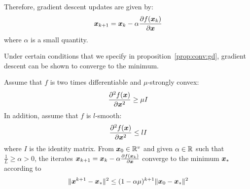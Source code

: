 Therefore, gradient descent updates are given by:
\begin{align}
  \xb_{k+1} = \xb_k -\alpha \partialfrac{\xb}{f(\xb_k)} \label{eq:update:gd}
\end{align}
where $\alpha$ is a small quantity.

Under certain conditions that we specify in proposition~\ref{prop:conv:gd},
gradient descent can be shown to converge to the minimum.

\begin{prop}
  \label{prop:conv:gd}
  Assume that $f$ is two times differentiable and $\mu$-strongly convex:
  \begin{equation}
    \partialfrac{\xb^2}{^2f(\xb)} \geq \mu I
  \end{equation}
  In addition, assume that $f$ is $l$-smooth:
  \begin{equation}
    \partialfrac{\xb^2}{^2f(\xb)} \leq lI
  \end{equation}
  where $I$ is the identity matrix.
  From $\xb_0 \in \RR^v$ and given $\alpha \in \RR$ such that $\frac1{L} \geq \alpha > 0$, the iterates
  $\xb_{k+1} = \xb_k -\alpha \partialfrac{\xb}{f(\xb_k)}$ converge to the
  minimum $\xb_*$ according to
  \begin{equation}
    \| \xb^{k+1} - \xb_* \|^2 \leq (1 - \alpha \mu)^{k + 1} \| \xb_0 - \xb_* \|^2
  \end{equation}
\end{prop}
